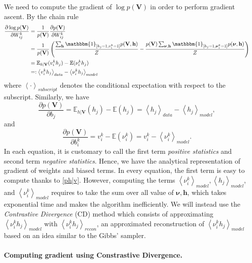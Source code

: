 \documentclass[bj, preprint]{imsart}
\newcommand{\cexp}[1]{\left<#1\right>}
\newcommand{\onebb}{\mathbbm{1}}
\newcommand{\Ebb}{\mathbb{E}}
\begin{document}
We need to compute the gradient of $\log p(\textbf{V})$ in order to perform gradient ascent. By the chain rule
\begin{align*}
\dfrac{\partial \log p(\textbf{V})}{\partial W_{ij}^{k}} &= \dfrac{1}{p(\textbf{V})} \dfrac{\partial p(\textbf{V})}{\partial W_{ij}^{k}} \\
& = \dfrac{1}{p(\textbf{V})} \left(\dfrac{\sum_{\textbf{h}} \onebb_{[h_j = 1, v_{i}^{k} = 1]} p(\textbf{V}, \textbf{h})}{Z} - \dfrac{p(\textbf{V}) \sum_{\boldsymbol{\nu}, \textbf{h}}\onebb_{[h_j = 1, \boldsymbol{\nu}_{i}^{k} = 1]} p(\boldsymbol{\nu}, \textbf{h})}{Z} \right)\\
& = \Ebb_{h|\textbf{V}}(v_i^k h_j) - \Ebb(\nu_i^k h_j)\\
& =: \cexp{v_i^k h_j}_{data} - \cexp{\nu_i^k h_j}_{model}
\end{align*}
where $\cexp{\cdot}_{subscript}$ denotes the conditional expectation with respect to the subscript. 
Similarly, we have
\begin{equation}
\dfrac{\partial p(\textbf{V})}{\partial b_j}  = \Ebb_{h|\textbf{V}} (h_j) - \Ebb(h_j) =  \cexp{h_j}_{data} - \cexp{h_j}_{model},
\end{equation}
and 
\begin{equation}
\dfrac{\partial p(\textbf{V})}{\partial b_i^k}  = v_i^k - \Ebb(\nu_i^k) = v_i^k - \cexp{\nu_i^k}_{model}.
\end{equation}
In each equation, it is customary to call the first term \textit{positive statistics} and second term \textit{negative statistics}. Hence, we have the analytical representation of gradient of weights and biased terms. In every equation, the first term is easy to compute thanks to \eqref{ph|v}. However, computing the terms $\cexp{\nu_{i}^{k}}_{model}, \cexp{h_j}_{model}$, and $\cexp{\nu_{i}^{k}}_{model}$ requires to take the sum over all value of $\boldsymbol{\nu}, \textbf{h}$, which takes exponential time and makes the algorithm inefficiently. We will instead use the \textit{Contrastive Divergence} (CD) method \citep{hinton2012practical} which consists of approximating $\cexp{\nu_i^k h_j}_{model}$ with $\cexp{\nu_i^k h_j}_{recon}$, an approximated reconstruction of $\cexp{\nu_i^k h_j}_{model}$ based on an idea similar to the Gibbs' sampler.

\paragraph{Computing gradient using Constrastive Divergence.}\label{par:method.models.rbm.grad}
\end{document}
